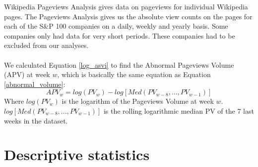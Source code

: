 Wikipedia Pageviews Analysis gives data on pageviews for individual Wikipedia pages. The Pageviews Analysis gives us the absolute view counts on the pages for each of the S\&P 100 companies on a daily, weekly and yearly basis. Some companies only had data for very short periods. These companies had to be excluded from our analyses. 
\\\\
We calculated Equation \eqref{log_asvi} to find the Abnormal Pageviews Volume (APV) at week $w$, which is basically the same equation as Equation \eqref{abnormal_volume}:
\begin{equation}
   \label{abnormal_pageviews_volume} 
   APV_{w} = log(PV_{w}) - log[Med(PV_{w-8},...,PV_{w-1})] 
\end{equation}
   Where $log(PV_{w})$ is the logarithm of the Pageviews Volume at week $w$. $log[Med(PV_{w-8},...,PV_{w-1})]$ is the rolling logarithmic median PV of the 7 last weeks in the dataset.
   
   \section{Descriptive statistics}






